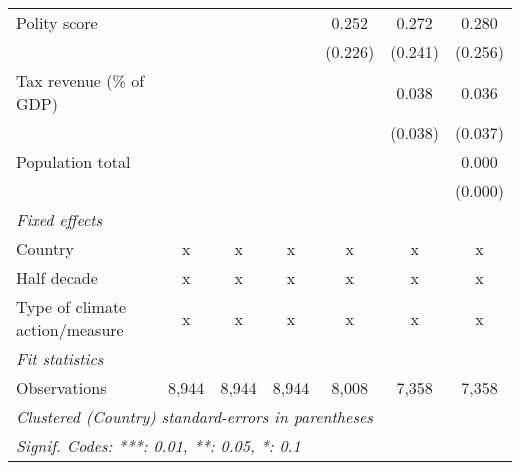 \begin{tabular}{lcccccc}
   Polity score                                                            &         &         &               & 0.252         & 0.272        & 0.280\\   
                                                                           &         &         &               & (0.226)       & (0.241)      & (0.256)\\   
   Tax revenue (\% of GDP)                                                 &         &         &               &               & 0.038        & 0.036\\   
                                                                           &         &         &               &               & (0.038)      & (0.037)\\   
   Population total                                                        &         &         &               &               &              & 0.000\\   
                                                                           &         &         &               &               &              & (0.000)\\   
   \emph{Fixed effects}\\
   Country                                                                 & x       & x       & x             & x             & x            & x\\  
   Half decade                                                             & x       & x       & x             & x             & x            & x\\  
   Type of climate action/measure                                          & x       & x       & x             & x             & x            & x\\  
   \midrule \emph{Fit statistics}\\
   Observations                                                            & 8,944   & 8,944   & 8,944         & 8,008         & 7,358        & 7,358\\  
   \midrule
   \multicolumn{7}{l}{\emph{Clustered (Country) standard-errors in parentheses}}\\
   \multicolumn{7}{l}{\emph{Signif. Codes: ***: 0.01, **: 0.05, *: 0.1}}\\
\end{tabular}
\par\endgroup



